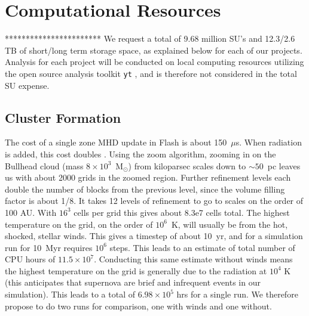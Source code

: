 \documentclass[11pt]{article}
\newcommand{\msun}{$\textrm{M}_{\odot}$}
\begin{document}
\section{Computational Resources}
***********************
We request a total of 9.68 million SU's and 12.3/2.6 TB of short/long term storage space, as explained below for each of our projects. Analysis for each project will be conducted on local computing resources utilizing the open source analysis toolkit \texttt{yt} \citep{yt}, and is therefore not considered in the total SU expense.

\subsection{Cluster Formation}




The cost of a single zone MHD update in Flash is about 150~$\mu$s. When radiation is added, this cost doubles \citep{WiseAbel2011}. Using the zoom algorithm, zooming in on the Bullhead cloud (mass $8 \times 10^3$~{\msun}) from kiloparsec scales down to $\sim50$~pc leaves us with about 2000 grids in the zoomed region. Further refinement levels each double the number of blocks from the previous level, since the volume filling factor is about 1/8. It takes 12 levels of refinement to go to scales on the order of 100 AU. With $16^3$ cells per grid this gives about 8.3e7 cells total. The highest temperature on the grid, on the order of $10^6$~K, will usually be from the hot, shocked, stellar winds. 
This gives a timestep of about 10~yr, and for a simulation run for 10~Myr requires $10^6$ steps. This leads to an estimate of total number of CPU hours of $11.5 \times 10^7$. Conducting this same estimate without winds means the highest temperature on the grid is generally due to the radiation at $10^4$ K (this anticipates that supernova are brief and infrequent events in our simulation). This leads to a total of $6.98 \times 10^5$ hrs for a single run. We therefore propose to do two runs for comparison, one with winds and one without.
\end{document}
